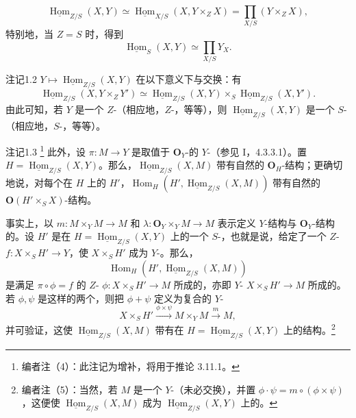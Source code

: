 \[
\underline{\operatorname{Hom}}_{Z/S}(X,Y)
\simeq\underline{\operatorname{Hom}}_{X/S}(X,Y\times_Z X)
=\prod_{X/S}(Y\times_Z X),\tag{6}
\]
特别地，当 $Z=S$ 时，得到
\[
\underline{\operatorname{Hom}}_S(X,Y)\simeq\prod_{X/S}Y_X.\tag{7}
\]
\begin{SGAresult}{注记}{1.2}
 $Y\mapsto\underline{\operatorname{Hom}}_{Z/S}(X,Y)$ 在以下意义下与交换：有
\[
\underline{\operatorname{Hom}}_{Z/S}(X,Y\times_Z Y')
\simeq\underline{\operatorname{Hom}}_{Z/S}(X,Y)\times_S
\underline{\operatorname{Hom}}_{Z/S}(X,Y').\tag{$*$}
\]
由此可知，若 $Y$ 是一个 $Z$-（相应地，$Z$-，等等），则 $\underline{\operatorname{Hom}}_{Z/S}(X,Y)$ 是一个 $S$-（相应地，$S$-，等等）。
\end{SGAresult}
\begin{SGAresult}{注记}{1.3}
\footnote{编者注（4）：此注记为增补，将用于推论 3.11.1。} 此外，设 $\pi:M\to Y$ 是取值于 $\mathbf O_Y$-的 $Y$-（参见 I，4.3.3.1）。置 $H=\underline{\operatorname{Hom}}_{Z/S}(X,Y)$。那么，$\underline{\operatorname{Hom}}_{Z/S}(X,M)$ 带有自然的 $\mathbf O_H$-结构；更确切地说，对每个在 $H$ 上的 $H'$，$\operatorname{Hom}_H(H',\underline{\operatorname{Hom}}_{Z/S}(X,M))$ 带有自然的 $\mathbf O(H'\times_S X)$-结构。
\end{SGAresult}
事实上，以 $m:M\times_Y M\to M$ 和 $\lambda:\mathbf O_Y\times_Y M\to M$ 表示定义 $Y$-结构与 $\mathbf O_Y$-结构的。设 $H'$ 是在 $H=\underline{\operatorname{Hom}}_{Z/S}(X,Y)$ 上的一个 $S$-，也就是说，给定了一个 $Z$- $f:X\times_S H'\to Y$，使 $X\times_S H'$ 成为 $Y$-。那么，
\[
\operatorname{Hom}_H(H',\underline{\operatorname{Hom}}_{Z/S}(X,M))
\]
是满足 $\pi\circ\phi=f$ 的 $Z$- $\phi:X\times_S H'\to M$ 所成的，亦即 $Y$- $X\times_S H'\to M$ 所成的。
若 $\phi,\psi$ 是这样的两个，则把 $\phi+\psi$ 定义为复合的 $Y$-
\[
X\times_S H'\xrightarrow{\phi\times\psi}M\times_Y M\xrightarrow m M,
\]
并可验证，这使 $\underline{\operatorname{Hom}}_{Z/S}(X,M)$ 带有在 $H=\underline{\operatorname{Hom}}_{Z/S}(X,Y)$ 上的结构。\footnote{编者注（5）：当然，若 $M$ 是一个 $Y$-（未必交换），并置 $\phi\cdot\psi=m\circ(\phi\times\psi)$，这便使 $\underline{\operatorname{Hom}}_{Z/S}(X,M)$ 成为 $\underline{\operatorname{Hom}}_{Z/S}(X,Y)$ 上的。}


